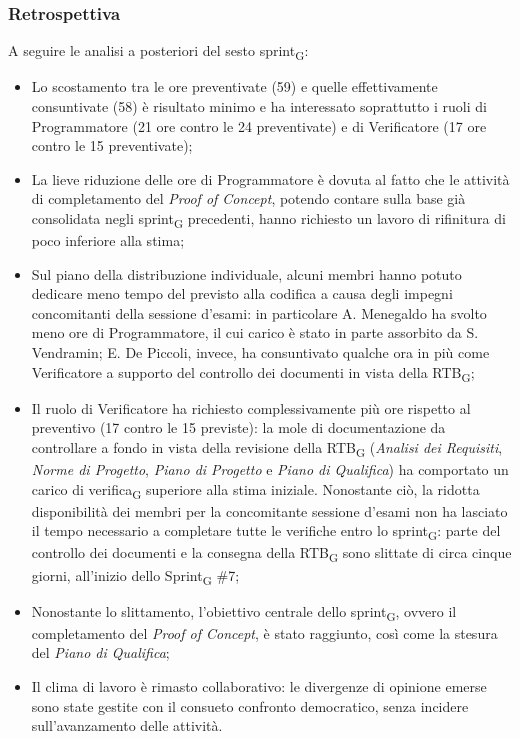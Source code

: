 ﻿\documentclass[a4paper, 10pt, colorlinks=true, linkcolor=black, urlcolor=blue, citecolor=blue, hidelinks]{article}
\begin{document}
\subsubsection{Retrospettiva}
A seguire le analisi a posteriori del sesto sprint\textsubscript{G}:
\begin{itemize}
    \item Lo scostamento tra le ore preventivate (59) e quelle effettivamente consuntivate (58) è risultato minimo e ha interessato soprattutto i ruoli di Programmatore (21 ore contro le 24 preventivate) e di Verificatore (17 ore contro le 15 preventivate);
    \item La lieve riduzione delle ore di Programmatore è dovuta al fatto che le attività di completamento del \textit{Proof of Concept}, potendo contare sulla base già consolidata negli sprint\textsubscript{G} precedenti, hanno richiesto un lavoro di rifinitura di poco inferiore alla stima;
    \item Sul piano della distribuzione individuale, alcuni membri hanno potuto dedicare meno tempo del previsto alla codifica a causa degli impegni concomitanti della sessione d'esami: in particolare A. Menegaldo ha svolto meno ore di Programmatore, il cui carico è stato in parte assorbito da S. Vendramin; E. De Piccoli, invece, ha consuntivato qualche ora in più come Verificatore a supporto del controllo dei documenti in vista della RTB\textsubscript{G};
    \item Il ruolo di Verificatore ha richiesto complessivamente più ore rispetto al preventivo (17 contro le 15 previste): la mole di documentazione da controllare a fondo in vista della revisione della RTB\textsubscript{G} (\textit{Analisi dei Requisiti}, \textit{Norme di Progetto}, \textit{Piano di Progetto} e \textit{Piano di Qualifica}) ha comportato un carico di verifica\textsubscript{G} superiore alla stima iniziale. Nonostante ciò, la ridotta disponibilità dei membri per la concomitante sessione d'esami non ha lasciato il tempo necessario a completare tutte le verifiche entro lo sprint\textsubscript{G}: parte del controllo dei documenti e la consegna della RTB\textsubscript{G} sono slittate di circa cinque giorni, all'inizio dello Sprint\textsubscript{G} \#7;
    \item Nonostante lo slittamento, l'obiettivo centrale dello sprint\textsubscript{G}, ovvero il completamento del \textit{Proof of Concept}, è stato raggiunto, così come la stesura del \textit{Piano di Qualifica};
    \item Il clima di lavoro è rimasto collaborativo: le divergenze di opinione emerse sono state gestite con il consueto confronto democratico, senza incidere sull'avanzamento delle attività.
\end{itemize}
\end{document}

